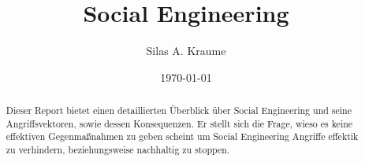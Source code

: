 \documentclass{report}
\begin{document}
\title{\Huge{Social Engineering}}
\author{Silas A. Kraume}
\date{\today}

\maketitle

\tableofcontents

\begin{abstract}
    Dieser Report bietet einen detaillierten Überblick über Social Engineering und seine Angriffsvektoren, sowie dessen Konsequenzen.
    Er stellt sich die Frage, wieso es keine effektiven Gegenmaßnahmen zu geben scheint um Social Engineering Angriffe effektik zu verhindern,
    beziehungsweise nachhaltig zu stoppen.
\end{abstract}








{}


\end{document}
